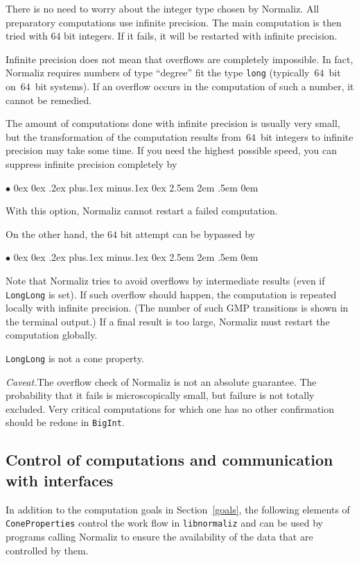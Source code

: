 \documentclass[12pt,a4paper]{scrartcl}
\newcommand{\stdli}{ \topsep0ex \partopsep0ex %
\parsep.2ex plus.1ex minus.1ex \itemsep0ex%
\leftmargin2.5em \labelwidth2em \labelsep.5em \rightmargin0em}%
\renewenvironment{itemize}{\begin{list}{{$\bullet$}}{\stdli}}{\end{list}}
\theoremstyle{definition}
\def\itemtt[#1]{\item[\textbf{\ttt{#1}}]}
\def\ttt{\texttt}
\begin{document}
There is no need to worry about the integer type chosen by Normaliz. All preparatory computations use infinite precision. The main computation is then tried with $64$ bit integers. If it fails, it will be restarted with infinite precision.

Infinite precision does not mean that overflows are completely impossible. In fact, Normaliz requires numbers of type ``degree'' fit the type \verb|long| (typically~$64$~bit on~$64$~bit systems). If an overflow occurs in the computation of such a number, it cannot be remedied.

The amount of computations done with infinite precision is usually very small, but the transformation of the computation results from~$64$~bit integers to infinite precision may take some time. If you need the highest possible speed, you can suppress infinite precision completely by
\begin{itemize}
	\itemtt[LongLong]
\end{itemize}
With this option, Normaliz cannot restart a failed computation.

On the other hand, the $64$ bit attempt can be bypassed by
\begin{itemize}
	\itemtt[BigInt, -B]
\end{itemize}

Note that Normaliz tries to avoid overflows by intermediate results (even if \verb|LongLong| is set). If such overflow should happen, the computation is repeated locally with infinite precision. (The number of such GMP transitions is shown in the terminal output.) If a final result is too large, Normaliz must restart the computation globally.

\verb|LongLong| is not a cone property.

\emph{Caveat.}\enspace The overflow check of Normaliz is not an absolute guarantee. The probability that it fails is microscopically small, but failure is not totally excluded. Very critical computations for which one has no other confirmation should be redone in \verb|BigInt|.

\subsection{Control of computations and communication with interfaces}

In addition to the computation goals in Section~\ref{goals},
the following elements of \verb|ConeProperties| control the work flow in \verb|libnormaliz| and can be used by programs calling Normaliz to ensure the availability of the data that are controlled by them.
\end{document}
